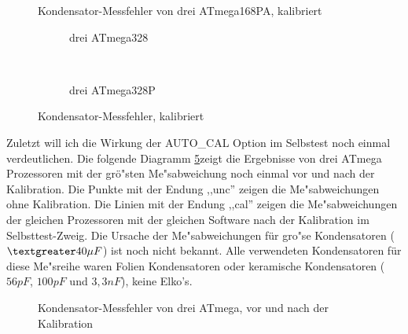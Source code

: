 \begin{figure}[H]
\centering

\caption{Kondensator-Messfehler von drei ATmega168PA, kalibriert}
\label{fig:mega168PAcal}
\end{figure}

\begin{figure}[H]
  \begin{subfigure}[b]{9cm}
    \centering
    \resizebox{9cm}{!}{}
    \caption{drei ATmega328}
    \label{fig:mega328cal}
  \end{subfigure}
  ~
  \begin{subfigure}[b]{9cm}
    \centering
    \resizebox{9cm}{!}{}
    \caption{drei ATmega328P}
    \label{fig:mega328Pcal}
  \end{subfigure}
  \caption{Kondensator-Messfehler, kalibriert}
\end{figure}

Zuletzt will ich die Wirkung der AUTO\_CAL Option im Selbstest noch einmal verdeutlichen.
Die folgende Diagramm \ref{fig:MegaAuto}zeigt die Ergebnisse von drei ATmega Prozessoren 
mit der gr\"o"sten Me"sabweichung noch einmal vor und nach der Kalibration.
Die Punkte mit der Endung ,,unc'' zeigen die Me"sabweichungen ohne Kalibration.
Die Linien mit der Endung ,,cal'' zeigen die Me"sabweichungen der gleichen Prozessoren
mit der gleichen Software nach der Kalibration im Selbsttest-Zweig.
Die Ursache der Me"sabweichungen f\"ur gro"se Kondensatoren (\( \textgreater 40 \mu F\)) ist
noch nicht bekannt. Alle verwendeten Kondensatoren f\"ur diese Me"sreihe waren
Folien Kondensatoren oder keramische Kondensatoren (\(56 pF\), \(100 pF\) und \(3,3 nF\)), keine Elko's.

\begin{figure}[H]
\centering

\caption{Kondensator-Messfehler von drei ATmega, vor und nach der Kalibration}
\label{fig:MegaAuto}
\end{figure}
